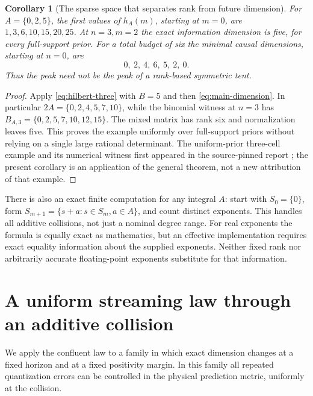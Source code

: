 \documentclass[11pt]{amsart}
\newtheorem{corollary}[theorem]{Corollary}
\theoremstyle{definition}\newtheorem{definition}[theorem]{Definition}
\theoremstyle{remark}\newtheorem{remark}[theorem]{Remark}
\begin{document}
\begin{corollary}[The sparse space that separates rank from future dimension]\label{cor:sparse-example}
For $A=\{0,2,5\}$, the first values of $h_A(m)$, starting at $m=0$,
are $1,3,6,10,15,20,25$. At $n=3,m=2$ the exact information dimension
is five, for every full-support prior. For a total budget of six the
minimal causal dimensions, starting at $n=0$, are
\[
 0,\ 2,\ 4,\ 6,\ 5,\ 2,\ 0.
\]
Thus the peak need not be the peak of a rank-based symmetric tent.
\end{corollary}
\begin{proof}
Apply \eqref{eq:hilbert-three} with $B=5$ and then
\eqref{eq:main-dimension}. In particular
$2A=\{0,2,4,5,7,10\}$, while the binomial witness at $n=3$ has
$B_{A,3}=\{0,2,5,7,10,12,15\}$. The mixed matrix has rank six
and normalization leaves five. This proves the example uniformly over
full-support priors without relying on a single large rational determinant.
The uniform-prior three-cell example and its numerical witness first
appeared in the source-pinned report \cite{A1review}; the present
corollary is an application of the general theorem, not a new attribution
of that example.
\end{proof}

There is also an exact finite computation for any integral $A$: start
with $S_0=\{0\}$, form $S_{m+1}=\{s+a:s\in S_m,a\in A\}$, and
count distinct exponents. This handles all additive collisions, not just
a nominal degree range. For real exponents the formula is equally exact
as mathematics, but an effective implementation requires exact equality
information about the supplied exponents. Neither fixed rank nor arbitrarily
accurate floating-point exponents substitute for that information.

\section{A uniform streaming law through an additive collision}\label{sec:uniform}
We apply the confluent law to a family in which exact dimension changes
at a fixed horizon and at a fixed positivity margin. In this family all
repeated quantization errors can be controlled in the physical prediction
metric, uniformly at the collision.
\end{document}
